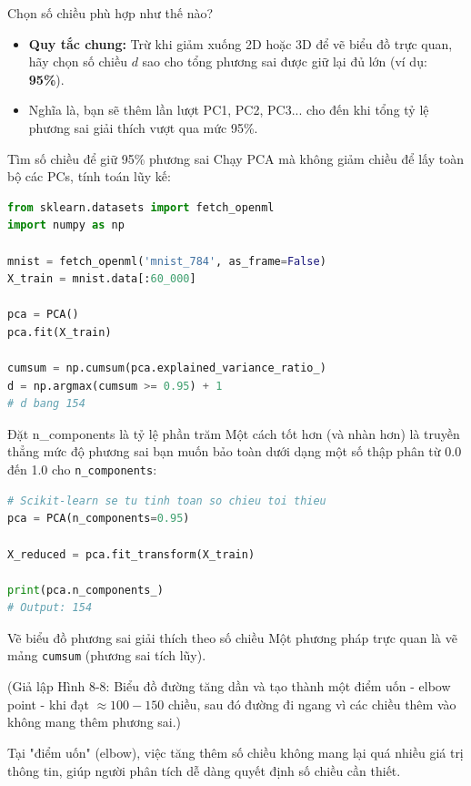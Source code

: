 \documentclass[aspectratio=169]{beamer}
\begin{document}
\begin{frame}{Chọn số chiều phù hợp như thế nào?}
    \begin{itemize}
        \item \textbf{Quy tắc chung:} Trừ khi giảm xuống 2D hoặc 3D để vẽ biểu đồ trực quan, hãy chọn số chiều $d$ sao cho tổng phương sai được giữ lại đủ lớn (ví dụ: \textbf{95\%}).
        \item Nghĩa là, bạn sẽ thêm lần lượt PC1, PC2, PC3... cho đến khi tổng tỷ lệ phương sai giải thích vượt qua mức 95\%.
    \end{itemize}
\end{frame}

\begin{frame}[fragile]{Tìm số chiều để giữ 95\% phương sai}
    Chạy PCA mà không giảm chiều để lấy toàn bộ các PCs, tính toán lũy kế:
    \begin{lstlisting}[language=Python]
from sklearn.datasets import fetch_openml
import numpy as np

mnist = fetch_openml('mnist_784', as_frame=False)
X_train = mnist.data[:60_000]

pca = PCA()
pca.fit(X_train)

cumsum = np.cumsum(pca.explained_variance_ratio_)
d = np.argmax(cumsum >= 0.95) + 1 
# d bang 154
    \end{lstlisting}
\end{frame}

\begin{frame}[fragile]{Đặt n\_components là tỷ lệ phần trăm}
    Một cách tốt hơn (và nhàn hơn) là truyền thẳng mức độ phương sai bạn muốn bảo toàn dưới dạng một số thập phân từ 0.0 đến 1.0 cho \texttt{n\_components}:
    \begin{lstlisting}[language=Python]
# Scikit-learn se tu tinh toan so chieu toi thieu
pca = PCA(n_components=0.95)

X_reduced = pca.fit_transform(X_train)

print(pca.n_components_) 
# Output: 154
    \end{lstlisting}
\end{frame}

\begin{frame}{Vẽ biểu đồ phương sai giải thích theo số chiều}
    Một phương pháp trực quan là vẽ mảng \texttt{cumsum} (phương sai tích lũy).
    \begin{center}
        (Giả lập Hình 8-8: Biểu đồ đường tăng dần và tạo thành một điểm uốn - elbow point - khi đạt $\approx 100-150$ chiều, sau đó đường đi ngang vì các chiều thêm vào không mang thêm phương sai.)
    \end{center}
    Tại "điểm uốn" (elbow), việc tăng thêm số chiều không mang lại quá nhiều giá trị thông tin, giúp người phân tích dễ dàng quyết định số chiều cần thiết.
\end{frame}
\end{document}
